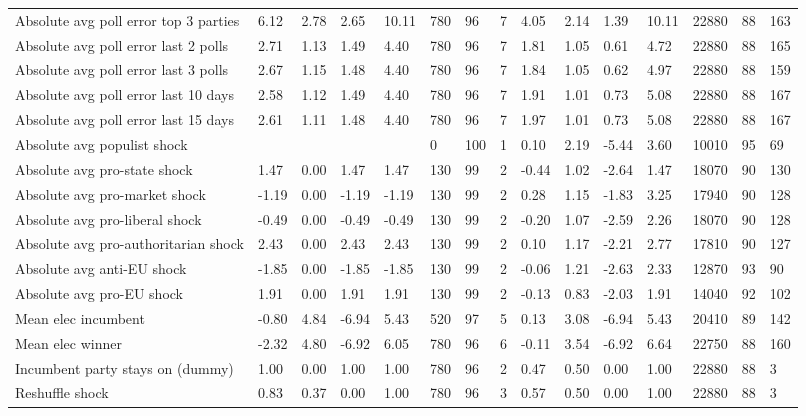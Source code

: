 \begin{longtable}{lllllllllllllll}
Absolute avg poll error top 3 parties & 6.12 & 2.78 & 2.65 & 10.11 & 780 & 96 & 7 & 4.05 & 2.14 & 1.39 & 10.11 & 22880 & 88 & 163\\
Absolute avg poll error last 2 polls & 2.71 & 1.13 & 1.49 & 4.40 & 780 & 96 & 7 & 1.81 & 1.05 & 0.61 & 4.72 & 22880 & 88 & 165\\
\addlinespace
Absolute avg poll error last 3 polls & 2.67 & 1.15 & 1.48 & 4.40 & 780 & 96 & 7 & 1.84 & 1.05 & 0.62 & 4.97 & 22880 & 88 & 159\\
Absolute avg poll error last 10 days & 2.58 & 1.12 & 1.49 & 4.40 & 780 & 96 & 7 & 1.91 & 1.01 & 0.73 & 5.08 & 22880 & 88 & 167\\
Absolute avg poll error last 15 days & 2.61 & 1.11 & 1.48 & 4.40 & 780 & 96 & 7 & 1.97 & 1.01 & 0.73 & 5.08 & 22880 & 88 & 167\\
Absolute avg populist shock &  &  &  &  & 0 & 100 & 1 & 0.10 & 2.19 & -5.44 & 3.60 & 10010 & 95 & 69\\
Absolute avg pro-state shock & 1.47 & 0.00 & 1.47 & 1.47 & 130 & 99 & 2 & -0.44 & 1.02 & -2.64 & 1.47 & 18070 & 90 & 130\\
\addlinespace
Absolute avg pro-market shock & -1.19 & 0.00 & -1.19 & -1.19 & 130 & 99 & 2 & 0.28 & 1.15 & -1.83 & 3.25 & 17940 & 90 & 128\\
Absolute avg pro-liberal shock & -0.49 & 0.00 & -0.49 & -0.49 & 130 & 99 & 2 & -0.20 & 1.07 & -2.59 & 2.26 & 18070 & 90 & 128\\
Absolute avg pro-authoritarian shock & 2.43 & 0.00 & 2.43 & 2.43 & 130 & 99 & 2 & 0.10 & 1.17 & -2.21 & 2.77 & 17810 & 90 & 127\\
Absolute avg anti-EU shock & -1.85 & 0.00 & -1.85 & -1.85 & 130 & 99 & 2 & -0.06 & 1.21 & -2.63 & 2.33 & 12870 & 93 & 90\\
Absolute avg pro-EU shock & 1.91 & 0.00 & 1.91 & 1.91 & 130 & 99 & 2 & -0.13 & 0.83 & -2.03 & 1.91 & 14040 & 92 & 102\\
\addlinespace
Mean elec incumbent & -0.80 & 4.84 & -6.94 & 5.43 & 520 & 97 & 5 & 0.13 & 3.08 & -6.94 & 5.43 & 20410 & 89 & 142\\
Mean elec winner & -2.32 & 4.80 & -6.92 & 6.05 & 780 & 96 & 6 & -0.11 & 3.54 & -6.92 & 6.64 & 22750 & 88 & 160\\
Incumbent party stays on (dummy) & 1.00 & 0.00 & 1.00 & 1.00 & 780 & 96 & 2 & 0.47 & 0.50 & 0.00 & 1.00 & 22880 & 88 & 3\\
Reshuffle shock & 0.83 & 0.37 & 0.00 & 1.00 & 780 & 96 & 3 & 0.57 & 0.50 & 0.00 & 1.00 & 22880 & 88 & 3\\

\end{longtable}
